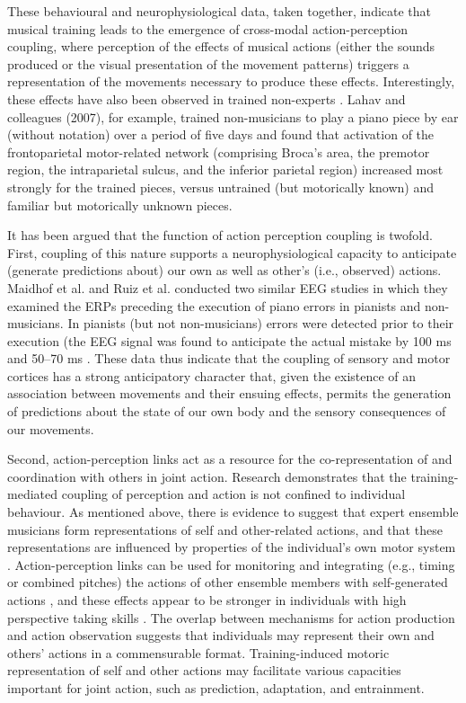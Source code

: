 \begin{CJK}{UTF8}{gbsn}
These behavioural and neurophysiological data, taken together, indicate that musical training leads to the emergence of cross-modal action-perception coupling, where perception of the effects of musical actions (either the sounds produced or the visual presentation of the movement patterns) triggers a representation of the movements necessary to produce these effects. Interestingly, these effects have also been observed in trained non-experts \citep{Bangert2003,Lahav2007}.  Lahav and colleagues (2007), for example, trained non-musicians to play a piano piece by ear (without notation) over a period of five days and found that activation of the frontoparietal motor-related network (comprising Broca’s area, the premotor region, the intraparietal sulcus, and the inferior parietal region) increased most strongly for the trained pieces, versus untrained (but motorically known) and familiar but motorically unknown pieces.

It has been argued that the function of action perception coupling is twofold.  First, coupling of this nature supports a neurophysiological capacity to anticipate (generate predictions about) our own as well as other's  (i.e., observed) actions.  Maidhof et al. \textcite{Maidhof2009} and Ruiz et al. \textcite{Ruiz2009} conducted two similar EEG studies in which they examined the ERPs preceding the execution of piano errors in pianists and non-musicians.  In pianists (but not non-musicians) errors were detected prior to their execution (the EEG signal was found to anticipate the actual mistake by 100 ms \citep{Maidhof2009} and 50–70 ms \citep{Ruiz009}.  These data thus indicate that the coupling of sensory and motor cortices has a strong anticipatory character that, given the existence of an association between movements and their ensuing effects, permits the generation of predictions about the state of our own body and the sensory consequences of our movements.

Second, action-perception links act as a resource for the co-representation of and coordination with others in joint action.
Research demonstrates that the training-mediated coupling of perception and action is not confined to individual behaviour.  As mentioned above, there is evidence to suggest that expert ensemble musicians form representations of self and other-related actions, and that these representations are influenced by properties of the individual’s own motor system \citep{Novembre2012}.  Action-perception links can be used for monitoring and integrating (e.g., timing or combined pitches) the actions of other ensemble members with self-generated actions \citep{Loehr2013}, and these effects appear to be stronger in individuals with high perspective taking skills \citep{Novembre2012,Loehr2013}.  The overlap between mechanisms for action production and action observation suggests that individuals may represent their own and others’ actions in a commensurable format.  Training-induced motoric representation of self and other actions may facilitate various capacities important for joint action, such as prediction, adaptation, and entrainment.



\end{CJK}
